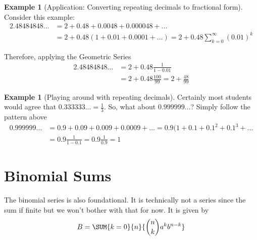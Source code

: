 \documentclass[10pt,]{book}
\theoremstyle{plain}
\theoremstyle{definition}
\theoremstyle{definition}
\newtheorem{example}[theorem]{Example}
\numberwithin{equation}{section}
\begin{document}
\begin{example}[Application: Converting repeating decimals to fractional form]\label{example-3}
Consider this example:%
\begin{align*}
2.48484848... & = 2 + 0.48 + 0.0048 + 0.000048 + ...\\
 &  = 2 + 0.48(1 + 0.01 + 0.0001 + ... ) = 2 + 0.48 \sum_{k=0}^\infty (0.01)^k
\end{align*}\par
Therefore, applying the Geometric Series%
\begin{align*}
 2.48484848... & = 2 + 0.48 \frac{1}{1-0.01} \\
 & = 2 + 0.48 \frac{100}{99} = 2 + \frac{48}{99} 
\end{align*}\end{example}
\begin{example}[Playing around with repeating decimals]\label{example-4}
Certainly most students would agree that \( 0.333333... = \frac{1}{3} \). 
			So, what about \(0.999999...\)?  
			Simply follow the pattern above%
\begin{align*}
0.999999... & = 0.9 + 0.09 + 0.009 + 0.0009 + ... = 0.9(1 + 0.1 + 0.1^2 + 0.1^3 + ...\\
 & = 0.9 \frac{1}{1-0.1} = 0.9 \frac{1}{0.9} = 1 
\end{align*}\end{example}
\typeout{************************************************}
\typeout{************************************************}
\section[]{}\label{NegativeBinomialSeries}
\typeout{************************************************}
\typeout{************************************************}
\section[Binomial Sums]{Binomial Sums}\label{section-3}

  The binomial series is also foundational. It is technically not a series since the sum if finite 
  but we won’t bother with that for now.  
  It is given by %
\begin{gather*}
B = \SUM {k=0} {n} {\binom{n}{k} a^k b^{n-k}}
\end{gather*}\typeout{************************************************}
\typeout{************************************************}
\end{document}
